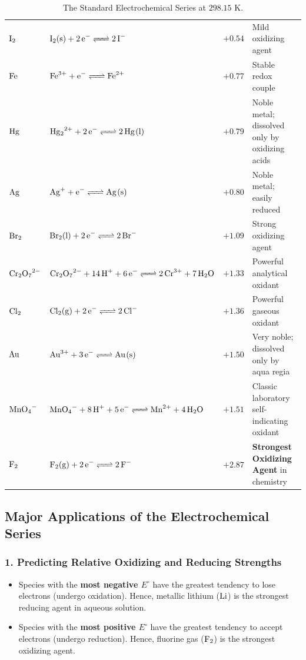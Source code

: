 \begin{table}[htbp]
\begin{tabularx}{\textwidth}{l X c p{4.2cm}}
$\ce{I2}$ & $\ce{I2(s) + 2e^- <=> 2I^-}$ & $+0.54$ & Mild oxidizing agent \\
$\ce{Fe}$ & $\ce{Fe^3+ + e^- <=> Fe^2+}$ & $+0.77$ & Stable redox couple \\
$\ce{Hg}$ & $\ce{Hg2^2+ + 2e^- <=> 2Hg(l)}$ & $+0.79$ & Noble metal; dissolved only by oxidizing acids \\
$\ce{Ag}$ & $\ce{Ag+ + e^- <=> Ag(s)}$ & $+0.80$ & Noble metal; easily reduced \\
$\ce{Br2}$ & $\ce{Br2(l) + 2e^- <=> 2Br^-}$ & $+1.09$ & Strong oxidizing agent \\
$\ce{Cr2O7^2-}$ & $\ce{Cr2O7^2- + 14H+ + 6e^- <=> 2Cr^3+ + 7H2O}$ & $+1.33$ & Powerful analytical oxidant \\
$\ce{Cl2}$ & $\ce{Cl2(g) + 2e^- <=> 2Cl^-}$ & $+1.36$ & Powerful gaseous oxidant \\
$\ce{Au}$ & $\ce{Au^3+ + 3e^- <=> Au(s)}$ & $+1.50$ & Very noble; dissolved only by aqua regia \\
$\ce{MnO4-}$ & $\ce{MnO4^- + 8H+ + 5e^- <=> Mn^2+ + 4H2O}$ & $+1.51$ & Classic laboratory self-indicating oxidant \\
$\ce{F2}$ & $\ce{F2(g) + 2e^- <=> 2F^-}$ & $+2.87$ & \textbf{Strongest Oxidizing Agent} in chemistry \\
\bottomrule
\end{tabularx}
\caption{The Standard Electrochemical Series at $298.15\text{ K}$.}
\label{tab:electrochemical_series}
\end{table}

\subsection{Major Applications of the Electrochemical Series}

\subsubsection{1. Predicting Relative Oxidizing and Reducing Strengths}
\begin{itemize}[leftmargin=*]
    \item Species with the \textbf{most negative $E^\circ$} have the greatest tendency to lose electrons (undergo oxidation). Hence, metallic lithium ($\ce{Li}$) is the strongest reducing agent in aqueous solution.
    \item Species with the \textbf{most positive $E^\circ$} have the greatest tendency to accept electrons (undergo reduction). Hence, fluorine gas ($\ce{F2}$) is the strongest oxidizing agent.
\end{itemize}

